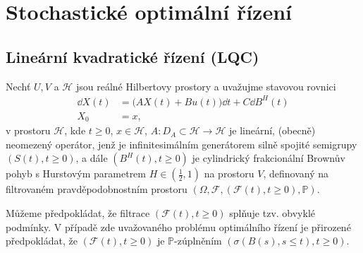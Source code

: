 
\chapter{Stochastické optimální řízení}


\section{Lineární kvadratické řízení (LQC)}
    \cite{duncan2012linear}
    Nechť $U,V$ a $\mathscr{H}$ jsou reálné Hilbertovy prostory a uvažujme
    stavovou rovnici
    \begin{align}
        \dd X(t) &= \big( A X(t) + B u(t) \big)\!\dd t + C \dd B^H(t)
        \label{eq:stateeq}\\
        X_0 &= x,
    \end{align}
    v prostoru $\mathscr{H}$, kde $t\geq0$, $x\in\mathscr{H}$, $A : D_A \subset
    \mathscr{H}\rightarrow\mathscr{H}$ je lineární, (obecně) neomezený
    operátor, jenž je infinitesimálním generátorem silně spojité semigrupy
    $\left(S(t),t\geq0\right)$, a dále $\left(B^H(t),t\geq0\right)$ je
    cylindrický frakcionální Brownův pohyb s Hurstovým parametrem 
    $H\in\left({\frac{1}{2},1}\right)$ na prostoru $V$, definovaný na
    filtrovaném pravděpodobnostním prostoru $\left( \Omega, \mathscr{F}, \left(
    \mathscr{F}(t),t\geq0\right),\mathbb{P} \right).$
    
    Můžeme předpokládat, že filtrace $\left( \mathscr{F}(t),
    t\geq0 \right)$ splňuje tzv. obvyklé podmínky. V případě zde uvažovaného
    problému optimálního řízení je přirozené předpokládat, že $\left( \mathscr{F}(t),
    t\geq0 \right)$ je $\mathbb{P}$-zúplněním $\left( \sigma \left( B(s), s\leq
    t \right),t\geq0 \right)$.
\\

